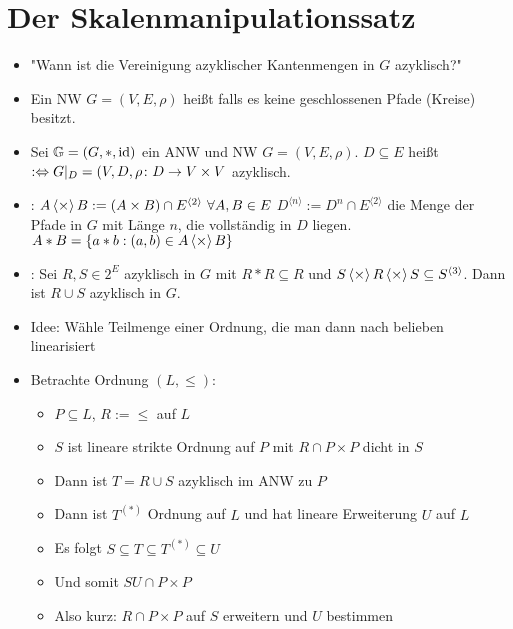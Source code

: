\documentclass[12pt]{scrartcl}
\begin{document}
	\section{Der Skalenmanipulationssatz}
	\begin{itemize}
		\item "Wann ist die Vereinigung azyklischer Kantenmengen in $G$ azyklisch?"	
		\item Ein NW $G=(V,E,\rho)$ heißt  falls es keine geschlossenen Pfade (Kreise) besitzt.
		\item Sei $\mathbb{G}=(G,\ast,\operatorname{id})$ ein ANW und NW $G=(V,E,\rho)$. 
		$D\subseteq E$ heißt  $:\Leftrightarrow G|_D=(V,D,\rho\colon D\to V\times V$ azyklisch.
		\item {}:
		$A\operatorname{\langle\times\rangle} B:=(A\times B)\cap E^{\langle2\rangle}~\forall A,B\in E$
		$D^{\langle n\rangle}:=D^n\cap E^{\langle2\rangle}$ die Menge der Pfade in $G$ mit Länge $n$, die vollständig in $D$ liegen.		
		$A\ast B=\lbrace a\ast b:(a,b)\in A\operatorname{\langle\times\rangle} B \rbrace$
		
		
		
		\item {}:
		Sei $R,S\in 2^E$ azyklisch in $G$ mit $R\ast R\subseteq R$ und $S\operatorname{\langle\times\rangle} R\operatorname{\langle\times\rangle} S\subseteq S^{\langle3\rangle}$.
	    Dann ist $R\cup S$ azyklisch in $G$.
	    \item Idee: Wähle Teilmenge einer Ordnung, die man dann nach belieben
            linearisiert
        \item Betrachte Ordnung $(L, \leq)$:
        \begin{itemize}
        	\item $P\subseteq L$, $R:=\leq$ auf $L$
        	\item $S$ ist lineare strikte Ordnung auf $P$ mit $R\cap P\times P$ dicht in $S$
        	\item Dann ist $T=R\cup S$ azyklisch im ANW zu $P$
        	\item Dann ist $T^{(\ast)}$ Ordnung auf $L$ und hat lineare Erweiterung $U$ auf $L$
        	\item Es folgt $S\subseteq T\subseteq T^{(\ast)}\subseteq U$
        	\item Und somit $SU\cap P\times P$
        	\item Also kurz: $R\cap P\times P$ auf $S$ erweitern und $U$ bestimmen
        \end{itemize}
	\end{itemize}
	
\end{document}
